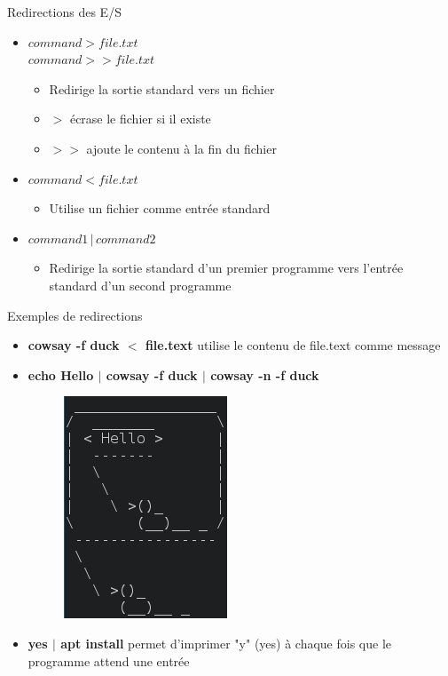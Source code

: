 \documentclass[xcolor=table]{beamer}
\begin{document}
\begin{frame}{Redirections des E/S}
\begin{itemize}
    \item $command > file.txt$ \\$command >> file.txt$
    \begin{itemize}
        \item Redirige la sortie standard vers un fichier
        \item $>$ écrase le fichier si il existe
        \item $>>$ ajoute le contenu à la fin du fichier
    \end{itemize}
    \item $command < file.txt$
    \begin{itemize}
        \item Utilise un fichier comme entrée standard
    \end{itemize}
    \item $command1 \,|\, command2$
    \begin{itemize}
        \item Redirige la sortie standard d'un premier programme vers l'entrée standard d'un second programme
    \end{itemize}
\end{itemize}
\end{frame}

\begin{frame}{Exemples de redirections}
\begin{itemize}
    \item \textbf{cowsay -f duck $<$ file.text} utilise le contenu de file.text comme message
    \item \textbf{echo Hello $|$ cowsay -f duck $|$ cowsay -n -f duck}
    \begin{figure}
        \includegraphics[scale=0.4]{fig/cowsay-inception.png}
    \end{figure}
    \item \textbf{yes $|$ apt install} permet d'imprimer "y" (yes) à chaque fois que le programme attend une entrée
\end{itemize}
\end{frame}
\end{document}

